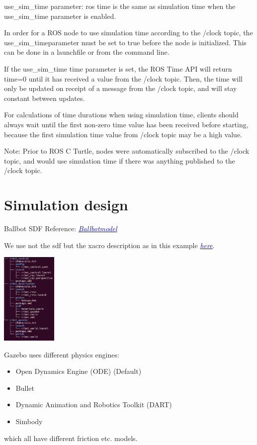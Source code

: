 \documentclass[twoside,colorback,accentcolor=tud4c,11pt]{tudreport}
\newcommand{\mylink}[2] {	\href{#1}{	\textit{\textcolor{blue}{#2}}}}
\begin{document}
use\_sim\_time parameter:
ros time is the same as simulation time when the use\_sim\_time parameter is enabled.

In order for a ROS node to use simulation time according to the /clock topic, the use\_sim\_timeparameter must be set to true before the node is initialized. This can be done in a launchfile or from the command line.

If the use\_sim\_time time parameter is set, the ROS Time API will return time=0 until it has received a value from the /clock topic. Then, the time will only be updated on receipt of a message from the /clock topic, and will stay constant between updates.

For calculations of time durations when using simulation time, clients should always wait until the first non-zero time value has been received before starting, because the first simulation time value from /clock topic may be a high value.

Note: Prior to ROS C Turtle, nodes were automatically subscribed to the /clock topic, and would use simulation time if there was anything published to the /clock topic. 

\section{Simulation design}

Ballbot SDF Reference:
\mylink{https://bitbucket.org/osrf/gazebo/issues/2335/how-to-set-the-friction-of-ballbot-the}{Ballbotmodel} 

We use not the sdf but the xacro description as in this example \mylink{http://gazebosim.org/tutorials/?tut=ros_urdf}{here}.

\begin{center}
		\includegraphics[width=0.2\textwidth]{img/filestructure.png} 
\end{center}

Gazebo uses different physics engines:\\
\begin{itemize}
	\item Open Dynamics Engine (ODE) (Default)
	\item Bullet
	\item Dynamic Animation and Robotics Toolkit (DART)
	\item Simbody
\end{itemize}
 which all have different friction etc. models.
\end{document}
